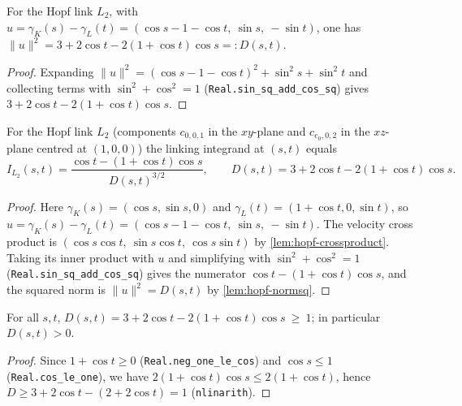 \begin{lemma}
    \label{lem:hopf-normsq}
    For the Hopf link $L_2$, with $u=\gamma_K(s)-\gamma_L(t)=(\cos s-1-\cos t,\ \sin
    s,\ -\sin t)$, one has $\lVert u\rVert^2 = 3+2\cos t-2(1+\cos t)\cos s =: D(s,t)$.
\end{lemma}
\begin{proof}
    Expanding $\lVert u\rVert^2=(\cos s-1-\cos t)^2+\sin^2 s+\sin^2 t$ and collecting
    terms with $\sin^2+\cos^2=1$ (\texttt{Real.sin\_sq\_add\_cos\_sq}) gives
    $3+2\cos t-2(1+\cos t)\cos s$.
\end{proof}

\begin{lemma}
    \label{lem:hopf-integrand}
    \leanok
    For the Hopf link $L_2$ (components $c_{0,0,1}$ in the $xy$-plane and
    $c_{e_0,0,2}$ in the $xz$-plane centred at $(1,0,0)$) the linking integrand at
    $(s,t)$ equals
    \[
        I_{L_2}(s,t)=\frac{\cos t-(1+\cos t)\cos s}{D(s,t)^{3/2}},
        \qquad D(s,t)=3+2\cos t-2(1+\cos t)\cos s .
    \]
\end{lemma}
\begin{proof}
    Here $\gamma_K(s)=(\cos s,\sin s,0)$ and $\gamma_L(t)=(1+\cos t,0,\sin t)$, so
    $u=\gamma_K(s)-\gamma_L(t)=(\cos s-1-\cos t,\ \sin s,\ -\sin t)$. The velocity
    cross product is $(\cos s\cos t,\ \sin s\cos t,\ \cos s\sin t)$ by
    \cref{lem:hopf-crossproduct}. Taking its inner product with $u$ and simplifying
    with $\sin^2+\cos^2=1$ (\texttt{Real.sin\_sq\_add\_cos\_sq}) gives the numerator
    $\cos t-(1+\cos t)\cos s$, and the squared norm is $\lVert u\rVert^2=D(s,t)$ by
    \cref{lem:hopf-normsq}.
\end{proof}

\begin{lemma}
    \label{lem:hopf-denominator-pos}
    For all $s,t$, $D(s,t)=3+2\cos t-2(1+\cos t)\cos s\ \ge\ 1$; in particular
    $D(s,t)>0$.
\end{lemma}
\begin{proof}
    Since $1+\cos t\ge0$ (\texttt{Real.neg\_one\_le\_cos}) and $\cos s\le1$
    (\texttt{Real.cos\_le\_one}), we have $2(1+\cos t)\cos s\le 2(1+\cos t)$, hence
    $D\ge 3+2\cos t-(2+2\cos t)=1$ (\texttt{nlinarith}).
\end{proof}

